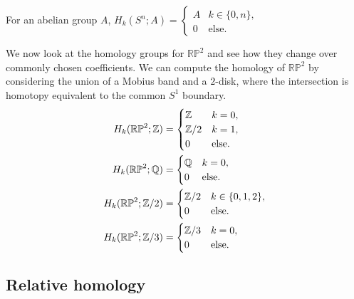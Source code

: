 \begin{example}
  For an abelian group $A$, $H_k(S^n;A) = \begin{cases}
      A & k \in \{0,n\}, \\
      0 & \text{else}.
    \end{cases}$
  \end{example}
\begin{example}
  We now look at the homology groups for $\mathbb{RP}^2$ and see how they change over commonly chosen coefficients. We can compute the homology of $\mathbb{RP}^2$ by considering the union of a Mobius band and a $2$-disk, where the intersection is homotopy equivalent to the common $S^1$ boundary.
  \begin{align*}
    H_k(\mathbb{RP}^2; \mathbb{Z})   & = \begin{cases}
                                   \mathbb{Z}   & k = 0,       \\
                                   \mathbb{Z}/2 & k = 1,       \\
                                   0    & \text{else}.
                                 \end{cases}     \\
    H_k(\mathbb{RP}^2; \mathbb{Q})   & = \begin{cases}
                                   \mathbb{Q} & k = 0,       \\
                                   0  & \text{else}.
                                 \end{cases}       \\
    H_k(\mathbb{RP}^2; \mathbb{Z}/2) & = \begin{cases}
                                   \mathbb{Z}/2 & k \in \{0,1,2\}, \\
                                   0    & \text{else}.
                                 \end{cases} \\
    H_k(\mathbb{RP}^2; \mathbb{Z}/3) & = \begin{cases}
                                   \mathbb{Z}/3 & k = 0,       \\
                                   0    & \text{else}.
                                 \end{cases}     \\
  \end{align*}
\end{example}

\subsection{Relative homology}


